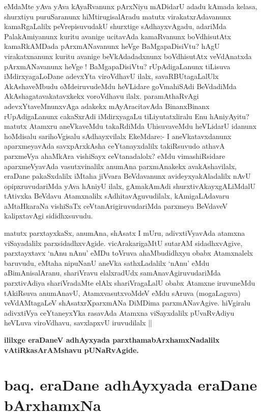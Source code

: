 \stext

\begin{artha}
eMdaMte  yAva yAva kAyaRvanunx pArxNiyu mADidarU  adadu kAmada kelasa,
shurxtiyu puruSaranunx hiMtirugisalAradu matutx virakatxrAdavanunx
kamaRgaLalilx peVrepisuvudakU shurxtige sAdhayxvAgadu, adariMda
PalakAmiyanunx kuritu avanige ucitavAda kamaRvanunx boVdhisutAtx
kamaRkAMDada pArxmANavanunx heVge BaMgapaDisiVtu? hAgU virakatxnanunx
kuritu avanige beVkAdadadxnunx boVdhisutAtx veVdAnatxda pArxmANavanunx
heVge ! BaMgapaDisiVtu? rUpAdigaLanunx tiLisuva iMdirxyagaLoDane
adevxYta viroVdhavU ilalx, savaRBUtagaLalUlx AkAshaveMbudu
oMdeiruvudeMdu heVLidare goVmahiSAdi BeVdadiMda AkAshagatavakatavxkekx
voroVdhavu ilalx. paramAthaRvAgi adevxYtaveMnunxvAga adakekx
mAyAracitavAda BinanxBinanx rUpAdigaLanunx cakaSxrAdi iMdirxyagaLu
tiLiyutatxliralu Enu hAniyAyitu? matutx Atamxru aneVkaveMdu
takaRdiMda UhisuvaveMdu heVLidarU idanunx hoMdisalu sarihoVgisalu
sAdhayxvilalx EkeMdare:- I aneVkatavxdanunx aparxmeyavAda
savxpArxkAsha ceYtanayxdalilx takiRsuvudo athavA parxmeVya ahaMkAra
vishiSayx ceVtanadalolx? eMdu vimashiRsidare aparxmeVyavAda
vasutxvinalilx anumAna parxmAnakekx avakAshavilalx, eraDane
pakaSxdalilx iMtaha jiVvara BeVdavanunx avideyxyakAladalilx nAvU
opipxruvudariMda yAva hAniyU ilalx, gAmakAmAdi shurxtivAkayxgALiMdalU
tAtivxka BeVdavu Atamxnalilx sAdhitavAguvudilalx, kAmigaLAdavaru
aMtaHkaraNa vishiSaTx ceVtanArigiruvudariMda parxmeya BeVdaveV
kalipxtavAgi sididhxsuvudu.

matutx parxtayxkaSx, anumAna, shAsatx I mUru, adivxtiVyavAda atamxna
viSayadalilx parxsidadhxvAgide. vicArakarigaMtU sutarAM sidadhxvAgive,
parxtayxtavx `nAnu nAnu' eMDu toVruva ahaMbudidhxyu obabx Atamxnalelx
baruvudu, eMtaha nipuNanU aneVka sathxLadalilx `nAnu' eMdu
aBimAnisalAranu, shariVravu elalxradUdx samAnavAgiruvudariMda
parxtivAdiya shariVradaMte elAlx shariVragaLalU obabx Atamxne
iruvuneMdu tAkiRsuva anumAnavU, AtamxvasutxvoMdeV eMdu sAruva
(mogaLaguva) veVdAMtagaLeV shAsatxrXparxmANa DiMDima
parxmANavAgive. hiVgiralu adivxtiVya ceYtaneyxYka rasavAda Atamxna
viSayxdalilx pUvaRvAdiyu heVLuva viroVdhavu, savxlapxvU iruvudilalx ||
\end{artha}

\begin{center}
\textbf{ililxge eraDaneV adhAyxyada parxthamabArxhamxNadalilx vAtiRkasArAMshavu pUNaRvAgide.}
\end{center}

\section*{baq. eraDane adhAyxyada eraDane bArxhamxNa}

